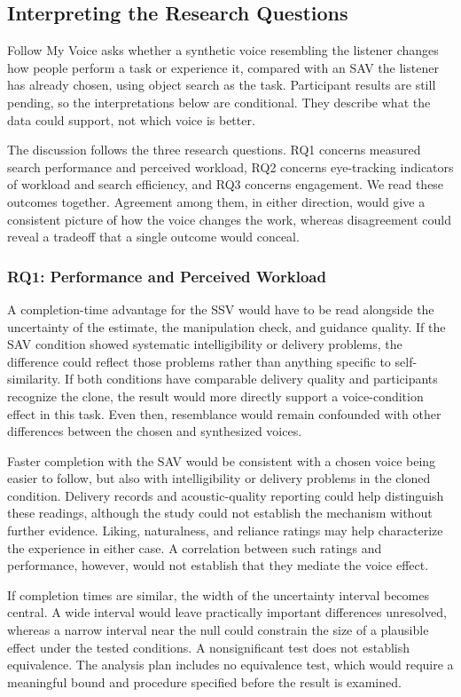 \subsection{Interpreting the Research Questions}
Follow My Voice asks whether a synthetic voice resembling the listener changes how people perform a task or experience it, compared with an SAV the listener has already chosen, using object search as the task. Participant results are still pending, so the interpretations below are conditional. They describe what the data could support, not which voice is better.

The discussion follows the three research questions. RQ1 concerns measured search performance and perceived workload, RQ2 concerns eye-tracking indicators of workload and search efficiency, and RQ3 concerns engagement. We read these outcomes together. Agreement among them, in either direction, would give a consistent picture of how the voice changes the work, whereas disagreement could reveal a tradeoff that a single outcome would conceal.

\subsubsection{RQ1: Performance and Perceived Workload}
A completion-time advantage for the SSV would have to be read alongside the uncertainty of the estimate, the manipulation check, and guidance quality. If the SAV condition showed systematic intelligibility or delivery problems, the difference could reflect those problems rather than anything specific to self-similarity. If both conditions have comparable delivery quality and participants recognize the clone, the result would more directly support a voice-condition effect in this task. Even then, resemblance would remain confounded with other differences between the chosen and synthesized voices.

Faster completion with the SAV would be consistent with a chosen voice being easier to follow, but also with intelligibility or delivery problems in the cloned condition. Delivery records and acoustic-quality reporting could help distinguish these readings, although the study could not establish the mechanism without further evidence. Liking, naturalness, and reliance ratings may help characterize the experience in either case. A correlation between such ratings and performance, however, would not establish that they mediate the voice effect.

If completion times are similar, the width of the uncertainty interval becomes central. A wide interval would leave practically important differences unresolved, whereas a narrow interval near the null could constrain the size of a plausible effect under the tested conditions. A nonsignificant test does not establish equivalence. The analysis plan includes no equivalence test, which would require a meaningful bound and procedure specified before the result is examined.

